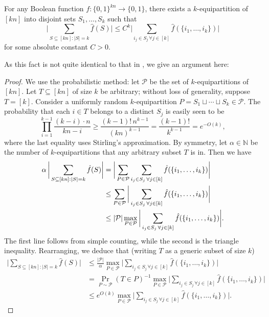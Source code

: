 \begin{fact}
\label{fact:f3}

For any Boolean function $f:\{0,1\}^{kn}\to \{0,1\}$, there exists a $k$-equipartition of $[kn]$ into disjoint sets $S_1,\ldots,S_k$ such that
\begin{equation*}
    \biggl| \sum_{S\subseteq [kn]:\vert S\vert=k} \hat{f}(S) \biggr|
    \leq C^k \biggl| \sum_{i_j\in S_j\, \forall j\in [k]} \hat{f}(\{i_1,\ldots,i_k\}) \biggr|
\end{equation*}
for some absolute constant $C>0$.
\end{fact}
As this fact is not quite identical to that in \cite{xorlemma}, we give an argument here:
\begin{proof}
We use the probabilistic method: let $\mathcal{P}$ be the set of $k$-equipartitions of $[kn]$. Let $T\subseteq [kn]$ of size $k$ be arbitrary; without loss of generality, suppose $T=[k]$. Consider a uniformly random $k$-equipartition $P=S_1\sqcup \cdots \sqcup S_k\in \mathcal{P}$. The probability that each $i\in T$ belongs to a distinct $S_j$ is easily seen to be
\begin{equation*}
    \prod_{i=1}^{k-1} \frac{(k-i)\cdot n}{kn-i}\geq \frac{(k-1)!\, n^{k-1}}{(kn)^{k-1}}=\frac{(k-1)!}{k^{k-1}}=e^{-O(k)},
\end{equation*}
where the last equality uses Stirling's approximation.  By symmetry, let $\alpha\in \mathbb{N}$ be the number of $k$-equipartitions that any arbitrary subset $T$ is in. Then we have
\begin{align*}
    \alpha \, \bigg\vert \sum_{S\subseteq [kn]:\vert S\vert=k} \hat{f}(S)\bigg\vert &= \bigg\vert \sum_{P\in \mathcal{P}} \sum_{i_j\in S_j\, \forall j\in [k]} \hat{f}(\{i_1,\ldots,i_k\})\bigg\vert\\
    &\leq \sum_{P\in \mathcal{P}}\bigg\vert \sum_{i_j\in S_j\, \forall j\in [k]} \hat{f}(\{i_1,\ldots,i_k\})\bigg\vert\\
    &\leq \vert \mathcal{P}\vert \max_{P\in \mathcal{P}} \bigg\vert \sum_{i_j\in S_j\, \forall j\in [k]} \hat{f}(\{i_1,\ldots,i_k\})\bigg\vert. \qedhere
\end{align*}
The first line follows from simple counting, while the second is the triangle inequality. Rearranging, we deduce that (writing $T$ as a generic subset of size $k$)
\begin{align*}
    \bigg\vert \sum_{S\subseteq [kn]:\vert S\vert=k} \hat{f}(S)\bigg\vert&\leq \frac{\vert \mathcal{P}\vert}{\alpha} \max_{P\in \mathcal{P}} \bigg\vert \sum_{i_j\in S_j\, \forall j\in [k]} \hat{f}(\{i_1,\ldots,i_k\})\bigg\vert\\
    &= \Pr_{P\sim \mathcal{P}}(T\in P)^{-1} \max_{P\in \mathcal{P}} \bigg\vert \sum_{i_j\in S_j\, \forall j\in [k]} \hat{f}(\{i_1,\ldots,i_k\})\bigg\vert\\
    &\leq e^{O(k)} \max_{P\in \mathcal{P}} \bigg\vert \sum_{i_j\in S_j\, \forall j\in [k]} \hat{f}(\{i_1,\ldots,i_k\})\bigg\vert.
\end{align*}
\end{proof}

